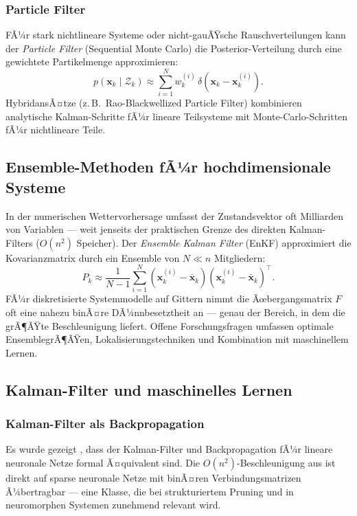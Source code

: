 ﻿\documentclass[a4paper,12pt]{article}
\theoremstyle{definition}
\begin{document}
\subsubsection{Particle Filter}

FÃ¼r stark nichtlineare Systeme oder nicht-gauÃŸsche Rauschverteilungen kann der
\emph{Particle Filter} (Sequential Monte Carlo) \cite{doucet2001} die Posterior-Verteilung
durch eine gewichtete Partikelmenge approximieren:
\[
    p(\mathbf{x}_k \mid \mathcal{Z}_k) \approx \sum_{i=1}^N w_k^{(i)}\,
    \delta(\mathbf{x}_k - \mathbf{x}_k^{(i)}).
\]
HybridansÃ¤tze (z.\,B.\ Rao-Blackwellized Particle Filter) kombinieren analytische
Kalman-Schritte fÃ¼r lineare Teilsysteme mit Monte-Carlo-Schritten fÃ¼r nichtlineare Teile.

\subsection{Ensemble-Methoden fÃ¼r hochdimensionale Systeme}

In der numerischen Wettervorhersage umfasst der Zustandsvektor oft Milliarden von
Variablen --- weit jenseits der praktischen Grenze des direkten Kalman-Filters
($O(n^2)$ Speicher). Der \emph{Ensemble Kalman Filter} (EnKF) \cite{evensen1994, evensen2003}
approximiert die Kovarianzmatrix durch ein Ensemble von $N \ll n$ Mitgliedern:
\[
    P_k \approx \frac{1}{N-1}\sum_{i=1}^N (\mathbf{x}_k^{(i)} - \bar{\mathbf{x}}_k)
                                           (\mathbf{x}_k^{(i)} - \bar{\mathbf{x}}_k)^\top.
\]
FÃ¼r diskretisierte Systemmodelle auf Gittern nimmt die Ãœbergangsmatrix $F$ oft eine
nahezu binÃ¤re DÃ¼nnbesetztheit an --- genau der Bereich, in dem \cite{epp2026boolmm}
die grÃ¶ÃŸte Beschleunigung liefert. Offene Forschungsfragen umfassen optimale
EnsemblegrÃ¶ÃŸen, Lokalisierungstechniken und Kombination mit maschinellem Lernen.

\subsection{Kalman-Filter und maschinelles Lernen}

\subsubsection{Kalman-Filter als Backpropagation}

Es wurde gezeigt \cite{ollivier2018}, dass der Kalman-Filter und Backpropagation fÃ¼r
lineare neuronale Netze formal Ã¤quivalent sind. Die $O(n^2)$-Beschleunigung aus
\cite{epp2026boolmm} ist direkt auf sparse neuronale Netze mit binÃ¤ren
Verbindungsmatrizen Ã¼bertragbar --- eine Klasse, die bei strukturiertem Pruning
und in neuromorphen Systemen zunehmend relevant wird.
\end{document}
